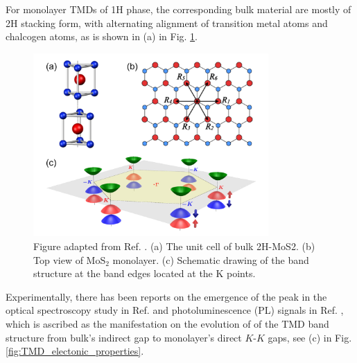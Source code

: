

For monolayer TMDs of 1H phase, the corresponding bulk material are mostly of 2H stacking form, with alternating alignment of transition metal atoms and chalcogen atoms, as is shown in (a) in Fig. \ref{fig:MoS2_Di}.
\begin{figure}[!htp]
    \centering
    \includegraphics[width=0.8\textwidth]{figures/MoS2_Di.png}
    \caption{Figure adapted from Ref. \cite{xiao2012coupled}. (a) The unit cell of bulk 2H-MoS2. (b) Top view of MoS$_2$ monolayer. (c) Schematic drawing of the band structure at the band edges located at the K points.}
    \label{fig:MoS2_Di}
\end{figure}
Experimentally, there has been reports on the emergence of the peak in the optical spectroscopy study in Ref. \cite{mak2010atomically} and photoluminescence (PL) signals in Ref. \cite{splendiani2010emerging}, which is ascribed as the manifestation on the evolution of of the TMD band structure from bulk's indirect gap to monolayer's direct $K$-$K$ gaps, see (c) in Fig. \ref{fig:TMD_electonic_properties}.

